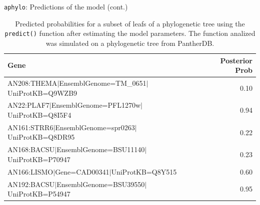 \documentclass[9pt,ignorenonframetext,]{beamer}
\begin{document}
\begin{frame}[t]{\texttt{aphylo}: Predictions of the model (cont.)}

\footnotesize

\begin{table}[ht]
\centering
\begin{tabular}{lr}
  \hline
Gene & Posterior Prob \\ 
  \hline
AN208:THEMA$|$EnsemblGenome=TM\_0651$|$UniProtKB=Q9WZB9 & 0.10 \\ 
  AN22:PLAF7$|$EnsemblGenome=PFL1270w$|$UniProtKB=Q8I5F4 & 0.94 \\ 
  AN161:STRR6$|$EnsemblGenome=spr0263$|$UniProtKB=Q8DR95 & 0.22 \\ 
  AN168:BACSU$|$EnsemblGenome=BSU11140$|$UniProtKB=P70947 & 0.23 \\ 
  AN166:LISMO$|$Gene=CAD00341$|$UniProtKB=Q8Y515 & 0.60 \\ 
  AN192:BACSU$|$EnsemblGenome=BSU39550$|$UniProtKB=P54947 & 0.95 \\ 
   \hline
\end{tabular}
\caption{Predicted probabilities for a subset of leafs of a phylogenetic tree using the {\tt predict()} function after estimating the model parameters. The function analized was simulated on a phylogenetic tree from PantherDB.} 
\end{table}

\normalsize

\end{frame}
\end{document}
